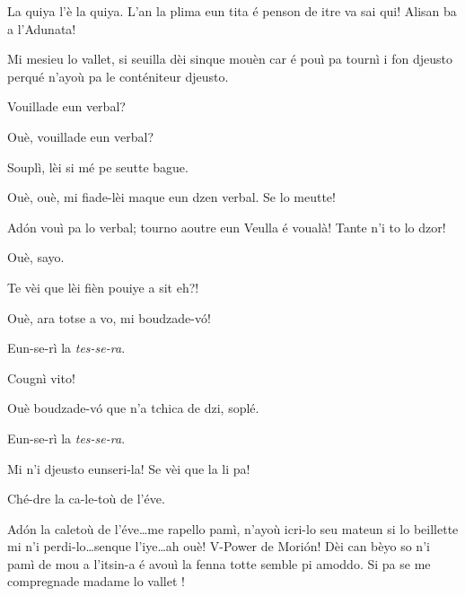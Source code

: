 \begin{drama}

\Prosperospeaks{} La quiya l'è la quiya.  L'an la plima eun tita é penson de itre va sai qui! Alisan ba a l'Adunata!

\Pierluigispeaks Mi mesieu lo vallet, si seuilla dèi sinque mouèn car é pouì pa tournì i fon djeusto perqué n'ayoù pa le conténiteur djeusto.

\Valletspeaks Vouillade eun verbal?

\Prosperospeaks Ouè, vouillade eun verbal?

\Valletspeaks {} Souplì, lèi si mé pe seutte bague.

\Prosperospeaks Ouè, ouè, mi fiade-lèi maque eun dzen verbal. Se lo meutte!

\Pierluigispeaks{} Ad\'on vouì pa lo verbal;  tourno aou\-tre eun Veulla é voualà! Tante n'i to lo dzor! 

\Valletspeaks Ouè, sayo.


\Prosperospeaks{} Te vèi que lèi fièn pouiye a sit eh?!

\Valletspeaks Ouè, ara totse a vo, mi boudzade-v\'o! 

\Machinaspeaks Eun-se-rì la \textit{tes-se-ra}.

\Prosperospeaks{} Cougnì vito!

\Valletspeaks Ouè boudzade-v\'o que n'a tchica de dzi, soplé.


\Machinaspeaks Eun-se-rì la \textit{tes-se-ra}.

\Prosperospeaks Mi n'i djeusto eunseri-la! Se vèi que la li pa!


\Machinaspeaks Ché-dre la ca-le-toù de l'éve.

\Prosperospeaks{} Ad\'on la caletoù de l'éve\ldots me rapello pamì, n'ayoù icri-lo seu mateun si lo beillette mi n'i perdi-lo\ldots senque l'iye\ldots ah ouè!  V-Power de Mori\'on! Dèi can bèyo so n'i pamì de mou a l'itsin-a é avouì la fenna totte semble pi amoddo. Si pa se me compregnade madame lo vallet \ok !


\end{drama}
